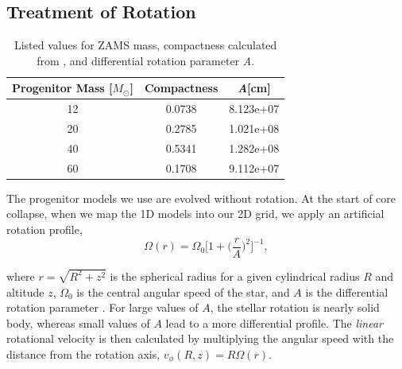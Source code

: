 \documentclass[twocolumn,times]{aastex62}  %
\begin{document}
\subsection{Treatment of Rotation}


\begin{table}[t]
\begin{tabular}{c|c|c}
Progenitor Mass [$M_\odot$] & Compactness & \textit{A}[cm] \\
\hline
12  & 0.0738 &         8.123e+07             \\
20  & 0.2785 &         1.021e+08            \\
40  & 0.5341 &         1.282e+08           \\
60  & 0.1708 &         9.112e+07          
\end{tabular}
\caption{Listed values for ZAMS mass, compactness calculated from \citet{Suk:2016}, and differential rotation parameter \textit{A}.}
\label{table:compact}
\end{table}

The progenitor models we use are evolved without rotation.
At the start of core collapse, when we map the 1D models into our 2D grid, we apply an artificial rotation profile,
\begin{equation}
    \Omega(r) = \Omega_0 \bigg[1 + \bigg(\frac{r}{A}\bigg)^2 \bigg]^{-1}, 
    \label{eq:omega}
\end{equation}

where $r = \sqrt{R^2 + z^2}$ is the spherical radius for a given cylindrical radius $R$ and altitude $z$, $\Omega_0$ is the central angular speed of the star, and $A$ is the differential rotation parameter \citep{eriguchi:1984}.  For large values of $A$, the stellar rotation is nearly solid body, whereas small values of $A$ lead to a more differential profile. 
The {\it linear} rotational velocity is then calculated by multiplying the angular speed with the distance from the rotation axis, $v_\phi (R, z) = R \Omega (r) $. 
\end{document}
